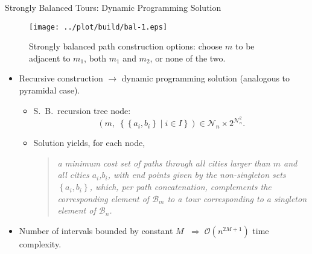 \documentclass[
  size=8pt,
  style=klope,
  paper=screen,
  mode=present,
  nohandoutpagebreaks,
  pauseslide,
  hlsections,
  fleqn,
]{powerdot}
\def\eqitspace{\vspace{-5mm}}
\begin{document}
\begin{slide}[toc=]{Strongly Balanced Tours: Dynamic Programming Solution}
    \begin{figure}[H]
      \centering
      \texttt{[image: ../plot/build/bal-1.eps]}
      \caption{
        Strongly balanced path construction options: choose $m$ to be adjacent to $m_1$, both $m_1$ and $m_2$, or none of the two.
     }
    \end{figure}
  \begin{itemize}
  \item
    Recursive construction $\rightarrow$ dynamic programming solution (analogous to pyramidal case).
    \begin{itemize}
    \item
      S.\ B.\ recursion tree node:
      \begin{equation}
      \left(m, \;
      \left\{\left\{a_i,b_i\right\} \mid i \in I\right\}\right)
       \in \mathcal{N}_n \times 2^{\mathcal{N}_n^2}.
      \end{equation}
      \eqitspace%
    \item
      Solution yields, for each node,
      \vspace{2mm}
      \begin{quote}
      {\itshape
        a minimum cost set of paths
        through all cities larger than $m$ and all cities $a_i$,$b_i$,
        with end points given by the non-singleton sets
        $\left\{a_i,b_i\right\}$,
        which, per path concatenation,
        complements the corresponding element of $\mathcal{B}_m$
        to a tour corresponding to a singleton element of $\mathcal{B}_n$.
      }
      \end{quote}
      \vspace{2mm}
    \end{itemize}
    \eqitspace%
  \item
    Number of intervals bounded by constant $M$ $\;\Rightarrow\;
    \mathcal{O}\left(n^{2M+1}\right)$ time complexity.
  \end{itemize}
\end{slide}
\end{document}
